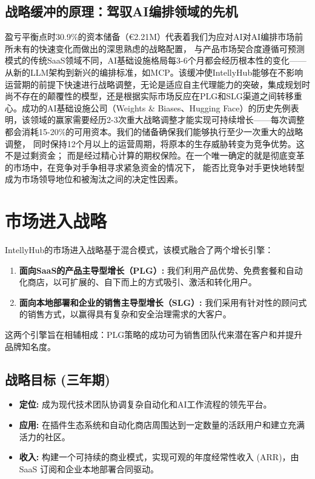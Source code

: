 \documentclass[11点, A4纸, 单面]{article}
\begin{document}
\subsection{战略缓冲的原理：驾驭AI编排领域的先机}
盈亏平衡点时30.9\%的资本储备（€2.21M）代表着我们为应对AI对AI编排市场前所未有的快速变化而做出的深思熟虑的战略配置， 与产品市场契合度遵循可预测模式的传统SaaS领域不同，AI基础设施格局每3-6个月都会经历根本性的变化——从新的LLM架构到新兴的编排标准，如MCP。该缓冲使IntellyHub能够在不影响运营期的前提下快速进行战略调整，无论是适应自主代理能力的突破，集成规划时尚不存在的颠覆性的模型，还是根据实际市场反应在PLG和SLG渠道之间转移重心。成功的AI基础设施公司（Weights \& Biases、Hugging Face）的历史先例表明，该领域的赢家需要经历2-3次重大战略调整才能实现可持续增长——每次调整都会消耗15-20\%的可用资本。我们的储备确保我们能够执行至少一次重大的战略调整， 同时保持12个月以上的运营周期，将原本的生存威胁转变为竞争优势。这不是过剩资金； 而是经过精心计算的期权保险。在一个唯一确定的就是彻底变革的市场中，在竞争对手争相寻求紧急资金的情况下， 能否比竞争对手更快地转型成为市场领导地位和被淘汰之间的决定性因素。

\newpage
\section{市场进入战略}

IntellyHub的市场进入战略基于混合模式，该模式融合了两个增长引擎：
\begin{enumerate}
    \item \textbf{面向SaaS的产品主导型增长（PLG）:} 我们利用产品优势、免费套餐和自动化商店，以可扩展的、自下而上的方式吸引、激活和转化用户。
    \item \textbf{面向本地部署和企业的销售主导型增长（SLG）:} 我们采用有针对性的顾问式的销售方式，以赢得具有复杂和安全治理需求的大客户。
\end{enumerate}
这两个引擎旨在相辅相成：PLG策略的成功可为销售团队代来潜在客户和并提升品牌知名度。



\subsection{战略目标 (三年期)}
\begin{itemize}
    \item \textbf{定位:} 成为现代技术团队协调复杂自动化和AI工作流程的领先平台。
    \item \textbf{应用:} 在插件生态系统和自动化商店周围达到一定数量的活跃用户和建立充满活力的社区。
    \item \textbf{收入:} 构建一个可持续的商业模式，实现可观的年度经常性收入 (ARR)，由 SaaS 订阅和企业本地部署合同驱动。
\end{itemize}
\end{document}
